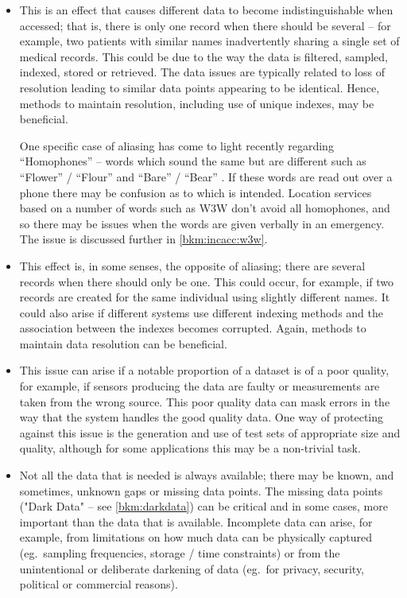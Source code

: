 \begin{itemize}
  \item {} This is an effect that causes different data to become indistinguishable when accessed; that is, there is only one record when there should be several -- for example, two patients with similar names inadvertently sharing a single set of medical records. This could be due to the way the data is filtered, sampled, indexed, stored or retrieved. The data issues are typically related to loss of \gls{resolution} leading to similar data points appearing to be identical. Hence, methods to maintain \gls{resolution}, including use of unique indexes, may be beneficial.

    One specific case of aliasing has come to light recently regarding ``Homophones'' -- words which sound the same but are different such as ``Flower'' / ``Flour'' and ``Bare'' / ``Bear'' \cite{citation:homonym}.
    If these words are read out over a phone there may be confusion as to which is intended.
    Location services based on a number of words such as W3W don't avoid all homophones,
    and so there may be issues when the words are given verbally in an emergency. The issue is discussed further in \autoref{bkm:incacc:w3w}.

  \item {} This effect is, in some senses, the opposite of aliasing; there are several records when there should only be one. This could occur, for example, if two records are created for the same individual using slightly different names. It could also arise if different systems use different indexing methods and the association between the indexes becomes corrupted. Again, methods to maintain data \gls{resolution} can be beneficial.

  \item {} This issue can arise if a notable proportion of a \gls{dataset} is of a poor \cbstart\gls{quality}\cbend, for example, if sensors producing the data are faulty or measurements are taken from the wrong source. This poor quality data can mask errors in the way that the system handles the good quality data. One way of protecting against this issue is the generation and use of test sets of appropriate size and quality, although for some applications this may be a non-trivial task.

  \item {} Not all the data that is needed is always available; there may be known, and sometimes, unknown gaps or missing data points. The missing data points ("Dark Data" -- see \autoref{bkm:darkdata}) can be critical and in some cases, more important than the data that is available. Incomplete data can arise, for example, from limitations on how much data can be physically captured (eg.~sampling frequencies, storage / time constraints) or from the unintentional or deliberate darkening of data (eg.~for privacy, security, political or commercial reasons).


\end{itemize}
